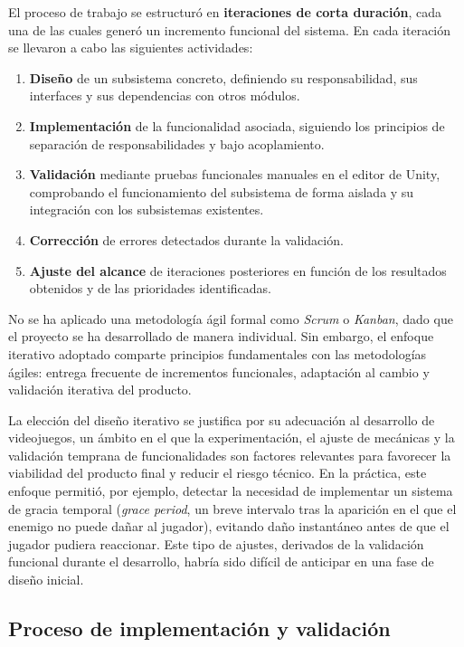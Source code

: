 El proceso de trabajo se estructuró en \textbf{iteraciones de corta duración}, cada una de las cuales generó un incremento funcional del sistema. En cada iteración se llevaron a cabo las siguientes actividades:

\begin{enumerate}
\item \textbf{Diseño} de un subsistema concreto, definiendo su responsabilidad, sus interfaces y sus dependencias con otros módulos.
\item \textbf{Implementación} de la funcionalidad asociada, siguiendo los principios de separación de responsabilidades y bajo acoplamiento.
\item \textbf{Validación} mediante pruebas funcionales manuales en el editor de Unity, comprobando el funcionamiento del subsistema de forma aislada y su integración con los subsistemas existentes.
\item \textbf{Corrección} de errores detectados durante la validación.
\item \textbf{Ajuste del alcance} de iteraciones posteriores en función de los resultados obtenidos y de las prioridades identificadas.
\end{enumerate}

No se ha aplicado una metodología ágil formal como \textit{Scrum} o \textit{Kanban}, dado que el proyecto se ha desarrollado de manera individual. Sin embargo, el enfoque iterativo adoptado comparte principios fundamentales con las metodologías ágiles: entrega frecuente de incrementos funcionales, adaptación al cambio y validación iterativa del producto.

La elección del diseño iterativo se justifica por su adecuación al desarrollo de videojuegos, un ámbito en el que la experimentación, el ajuste de mecánicas y la validación temprana de funcionalidades son factores relevantes para favorecer la viabilidad del producto final y reducir el riesgo técnico. En la práctica, este enfoque permitió, por ejemplo, detectar la necesidad de implementar un sistema de gracia temporal (\textit{grace period}, un breve intervalo tras la aparición en el que el enemigo no puede dañar al jugador), evitando daño instantáneo antes de que el jugador pudiera reaccionar. Este tipo de ajustes, derivados de la validación funcional durante el desarrollo, habría sido difícil de anticipar en una fase de diseño inicial.

\subsection{Proceso de implementación y validación}


